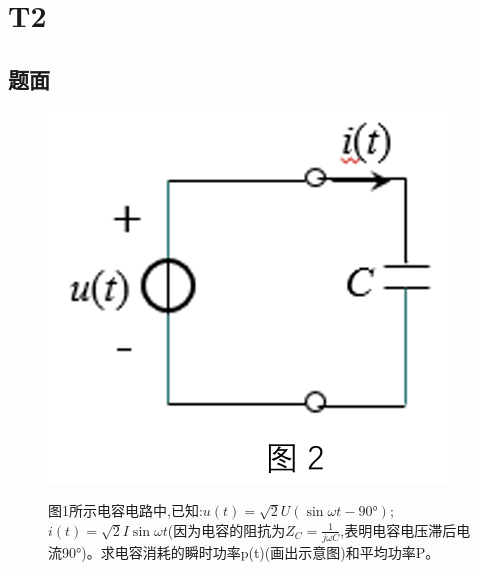 \documentclass[10pt, a4paper]{article} %
\begin{document}
\clearpage

\section{T2}
\subsection{题面}
\begin{figure}[htbp] %
    \centering
    \begin{minipage}[t]{0.40\textwidth} %
        \centering
        \includegraphics[width=\linewidth]{image/T2.png} %
        \label{fig:side:b}
    \end{minipage}
    \hfill %
    \begin{minipage}[t]{0.66\textwidth} %


        图1所示电容电路中,已知:$u\left(t\right) =  \sqrt{2}U(\sin\omega t - 90°) $;$i\left(t\right)=\sqrt{2}I\sin\omega t $(因为电容的阻抗为$Z_{C}=\frac{1}{j\omega C}$,表明电容电压滞后电流90°)。求电容消耗的瞬时功率p(t)(画出示意图)和平均功率P。

    \end{minipage}
\end{figure}
\end{document}
